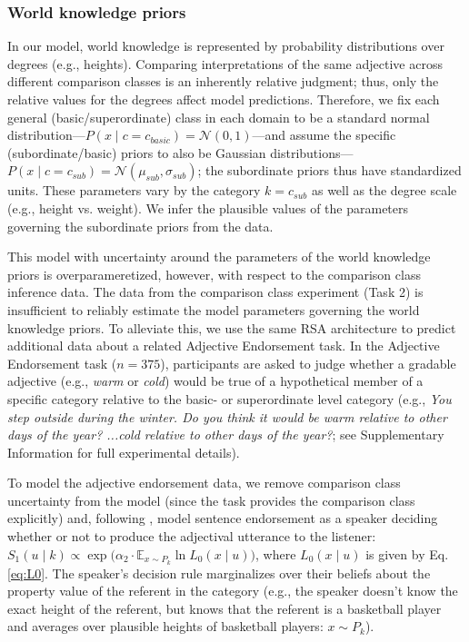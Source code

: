 \documentclass[doc]{apa6}
\begin{document}
\subsubsection{World knowledge priors}

In our model, world knowledge is represented by probability distributions over degrees (e.g., heights).
Comparing interpretations of the same adjective across different comparison classes is an inherently relative judgment; thus, only the relative values for the degrees affect model predictions. 
Therefore, we fix each general (basic/superordinate) class in each domain to be a standard normal distribution---$P(x \mid c = c_{basic}) = \mathcal{N}(0, 1)$---and assume the specific (subordinate/basic) priors to also be Gaussian distributions---\(P(x \mid c = c_{sub}) = \mathcal{N}(\mu_{sub}, \sigma_{sub})\); the subordinate priors thus have standardized units.
These parameters vary by the category $k = c_{sub}$ as well as the degree scale (e.g., height vs. weight).
We infer the plausible values of the parameters governing the subordinate priors from the data.

This model with uncertainty around the parameters of the world knowledge priors is overparameretized, however, with respect to the comparison class inference data. The data from the comparison class experiment (Task 2) is insufficient to reliably estimate the model parameters governing the world knowledge priors. 
To alleviate this, we use the same RSA architecture to predict additional data about a related Adjective Endorsement task. 
In the Adjective Endorsement task ($n=375$), participants are asked to judge whether a gradable adjective (e.g., \emph{warm} or \emph{cold}) would be true of a hypothetical member of a specific category relative to the basic- or superordinate level category (e.g., \emph{You step outside during the winter. Do you think it would be warm relative to other days of the year? ...cold relative to other days of the year?}; see Supplementary Information for full experimental details).

To model the adjective endorsement data, we remove comparison class uncertainty from the model (since the task provides the comparison class explicitly) and, following , model sentence endorsement as a speaker deciding whether or not to produce the adjectival utterance to the listener: $S_{1}(u \mid k) \propto \exp{(\alpha_2 \cdot {\mathbb E}_{x\sim P_{k}}} \ln{L_0(x \mid u)})$, where $L_0(x \mid u)$ is given by Eq. \ref{eq:L0}. 
The speaker's decision rule marginalizes over their beliefs about the property value of the referent in the category (e.g., the speaker doesn't know the exact height of the referent, but knows that the referent is a basketball player and averages over plausible heights of basketball players: $x\sim P_{k}$).
\end{document}
